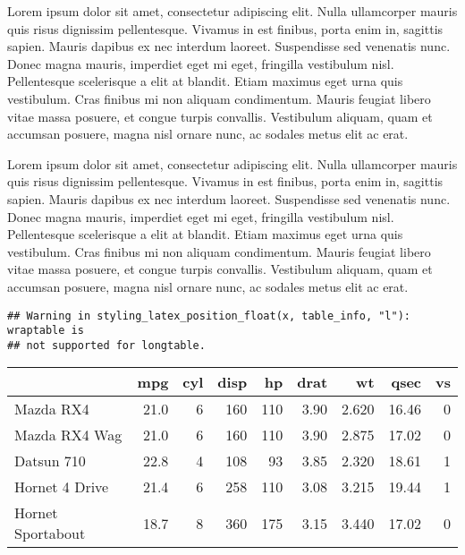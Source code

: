 \documentclass[]{article}
\newenvironment{Shaded}{\begin{snugshade}}{\end{snugshade}}
\newcommand{\KeywordTok}[1]{\textcolor[rgb]{0.13,0.29,0.53}{\textbf{{#1}}}}
\newcommand{\DataTypeTok}[1]{\textcolor[rgb]{0.13,0.29,0.53}{{#1}}}
\newcommand{\DecValTok}[1]{\textcolor[rgb]{0.00,0.00,0.81}{{#1}}}
\newcommand{\StringTok}[1]{\textcolor[rgb]{0.31,0.60,0.02}{{#1}}}
\newcommand{\NormalTok}[1]{{#1}}
\begin{document}

Lorem ipsum dolor sit amet, consectetur adipiscing elit. Nulla
ullamcorper mauris quis risus dignissim pellentesque. Vivamus in est
finibus, porta enim in, sagittis sapien. Mauris dapibus ex nec interdum
laoreet. Suspendisse sed venenatis nunc. Donec magna mauris, imperdiet
eget mi eget, fringilla vestibulum nisl. Pellentesque scelerisque a elit
at blandit. Etiam maximus eget urna quis vestibulum. Cras finibus mi non
aliquam condimentum. Mauris feugiat libero vitae massa posuere, et
congue turpis convallis. Vestibulum aliquam, quam et accumsan posuere,
magna nisl ornare nunc, ac sodales metus elit ac erat.

Lorem ipsum dolor sit amet, consectetur adipiscing elit. Nulla
ullamcorper mauris quis risus dignissim pellentesque. Vivamus in est
finibus, porta enim in, sagittis sapien. Mauris dapibus ex nec interdum
laoreet. Suspendisse sed venenatis nunc. Donec magna mauris, imperdiet
eget mi eget, fringilla vestibulum nisl. Pellentesque scelerisque a elit
at blandit. Etiam maximus eget urna quis vestibulum. Cras finibus mi non
aliquam condimentum. Mauris feugiat libero vitae massa posuere, et
congue turpis convallis. Vestibulum aliquam, quam et accumsan posuere,
magna nisl ornare nunc, ac sodales metus elit ac erat.

\begin{Shaded}
\end{Shaded}

\begin{verbatim}
## Warning in styling_latex_position_float(x, table_info, "l"): wraptable is
## not supported for longtable.
\end{verbatim}

\begingroup\fontsize{6}{8}\selectfont
{}

\begin{longtable}[l]{lrrrrrrrr}
\toprule
  & mpg & cyl & disp & hp & drat & wt & qsec & vs\\
\midrule
Mazda RX4 & 21.0 & 6 & 160 & 110 & 3.90 & 2.620 & 16.46 & 0\\
Mazda RX4 Wag & 21.0 & 6 & 160 & 110 & 3.90 & 2.875 & 17.02 & 0\\
Datsun 710 & 22.8 & 4 & 108 & 93 & 3.85 & 2.320 & 18.61 & 1\\
Hornet 4 Drive & 21.4 & 6 & 258 & 110 & 3.08 & 3.215 & 19.44 & 1\\
Hornet Sportabout & 18.7 & 8 & 360 & 175 & 3.15 & 3.440 & 17.02 & 0\\
\bottomrule
\end{longtable}
\end{document}
